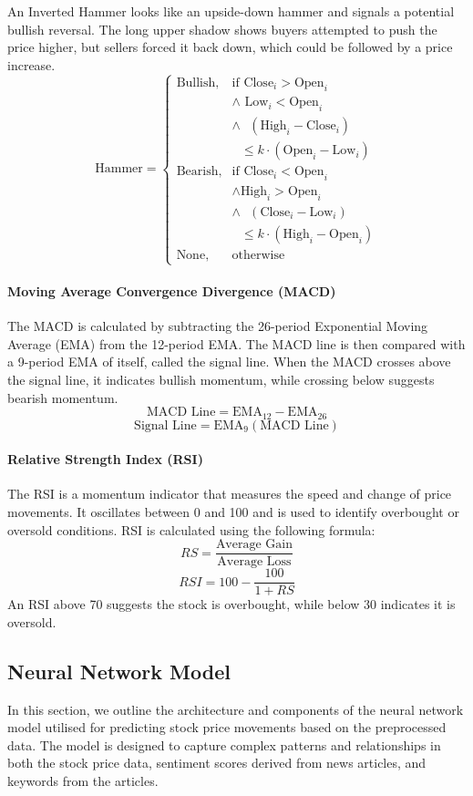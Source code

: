 \documentclass[conference]{IEEEtran}
\begin{document}
An Inverted Hammer looks like an upside-down hammer and signals a potential bullish reversal. The long upper shadow shows buyers attempted to push the price higher, but sellers forced it back down, which could be followed by a price increase.
\[
\text{Hammer} = 
\begin{cases}
\text{Bullish}, & \text{if} \text{ Close}_{i} > \text{Open}_{i} \\
& \land \text{ Low}_{i} < \text{Open}_{i} \\
& \land \text{ } (\text{High}_{i} - \text{Close}_{i}) \\
& \text{    } \leq k \cdot (\text{Open}_{i} - \text{Low}_{i}) \\
\text{Bearish}, & \text{if} \text{ Close}_{i} < \text{Open}_{i} \\
& \land \text{High}_{i} > \text{Open}_{i} \\
& \land \text{ } (\text{Close}_{i} - \text{Low}_{i}) \\
& \text{    } \leq k \cdot (\text{High}_{i} - \text{Open}_{i}) \\
\text{None}, & \text{otherwise}
\end{cases}
\]

\paragraph{Moving Average Convergence Divergence (MACD)}
The MACD is calculated by subtracting the 26-period Exponential Moving Average (EMA) from the 12-period EMA. The MACD line is then compared with a 9-period EMA of itself, called the signal line. When the MACD crosses above the signal line, it indicates bullish momentum, while crossing below suggests bearish momentum.
\[
\text{MACD Line} = \text{EMA}_{12} - \text{EMA}_{26}
\]
\[
\text{Signal Line} = \text{EMA}_{9}(\text{MACD Line})
\]

\paragraph{Relative Strength Index (RSI)}
The RSI is a momentum indicator that measures the speed and change of price movements. It oscillates between 0 and 100 and is used to identify overbought or oversold conditions. RSI is calculated using the following formula:
\[
RS = \frac{\text{Average Gain}}{\text{Average Loss}}
\]
\[
RSI = 100 - \frac{100}{1 + RS}
\]
An RSI above 70 suggests the stock is overbought, while below 30 indicates it is oversold.

\subsection{Neural Network Model}
In this section, we outline the architecture and components of the neural network model utilised for predicting stock price movements based on the preprocessed data. The model is designed to capture complex patterns and relationships in both the stock price data, sentiment scores derived from news articles, and keywords from the articles.
\end{document}

